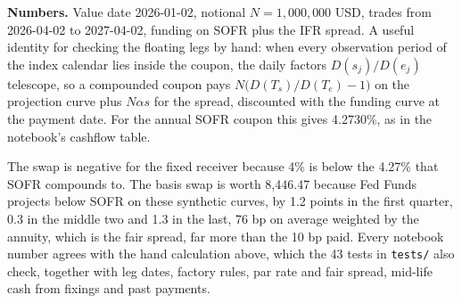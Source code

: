 \documentclass[10pt]{article}
\newcommand{\code}[1]{\texttt{#1}}
\begin{document}
\textbf{Numbers.} Value date 2026-01-02, notional $N=1,000,000$ USD, trades from 2026-04-02 to 2027-04-02, funding on SOFR plus the
IFR spread. A useful identity for checking the floating legs by hand: when every observation period of the index calendar lies inside
the coupon, the daily factors $D(s_j)/D(e_j)$ telescope, so a compounded coupon pays $N\bigl(D(T_s)/D(T_e)-1\bigr)$ on the projection curve
plus $N\alpha s$ for the spread, discounted with the funding curve at the payment date. For the annual SOFR coupon this gives 4.2730\%, as in the notebook's cashflow table.\par
{}
\vspace{3pt}
The swap is negative for the fixed receiver because 4\% is below the 4.27\% that SOFR compounds to. The basis swap is worth 8,446.47
because Fed Funds projects below SOFR on these synthetic curves, by 1.2 points in the first quarter, 0.3 in the middle two and 1.3 in
the last, 76 bp on average weighted by the annuity, which is the fair spread, far more than the 10 bp paid. Every notebook number agrees
with the hand calculation above, which the 43 tests in \code{tests/} also check, together with leg dates, factory rules, par rate
and fair spread, mid-life cash from fixings and past payments.
\end{document}
